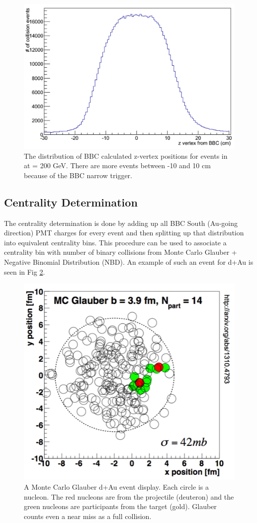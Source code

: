 \begin{figure}[h!]
\begin{center}
\includegraphics[width=0.65\linewidth]{figs/bbc_z_vertex_dist.png}
\caption{The distribution of BBC calculated z-vertex positions for events in \pau at \sqsn = 200 GeV. There are more events between -10 and 10 cm because of the BBC narrow trigger.}\label{fig:bbc_z_vtx_dist}
\end{center}
\end{figure}

\iffalse

\subsection{Centrality Determination}
\label{sec:central_determin}
The centrality determination is done by adding up all BBC South (Au-going direction) PMT charges for every event and then splitting up that distribution into equivalent centrality bins. This procedure can be used to associate a centrality bin with number of binary collisions from Monte Carlo Glauber + Negative Binomial Distribution (NBD). An example of such an event for d+Au is seen in Fig \ref{fig:glauber_event_display}. 
\label{centrality_determination}
\begin{figure}
\begin{center}
\includegraphics[width=0.5\linewidth]{figs/glauber_event_display.png}
\caption{A Monte Carlo Glauber d+Au event display. Each circle is a nucleon. The red nucleons are from the projectile (deuteron) and the green nucleons are participants from the target (gold). Glauber counts even a near miss as a full collision.}
\label{fig:glauber_event_display}
\end{center}
\end{figure}

